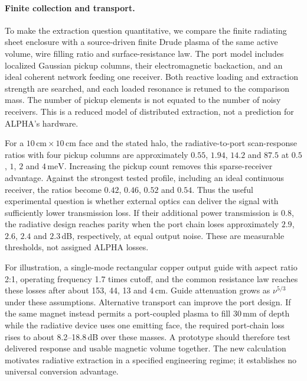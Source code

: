 \paragraph{Finite collection and transport.}
To make the extraction question quantitative, we compare the finite radiating
sheet enclosure with a source-driven finite Drude plasma of the same active
volume, wire filling ratio and surface-resistance law. The port model includes
localized Gaussian pickup columns, their electromagnetic backaction, and an
ideal coherent network feeding one receiver. Both reactive loading and
extraction strength are searched, and each loaded resonance is retuned to the
comparison mass. The number of pickup elements is not equated to the number
of noisy receivers. This is a reduced model of distributed extraction, not a
prediction for ALPHA's hardware.

For a $10\,\mathrm{cm}\times10\,\mathrm{cm}$ face and the stated halo,
the radiative-to-port scan-response ratios with four pickup columns are
approximately $0.55$, $1.94$, $14.2$ and $87.5$ at $0.5$, $1$, $2$ and
$4\,\mathrm{meV}$. Increasing the pickup count removes this sparse-receiver
advantage. Against the strongest tested profile, including an ideal continuous
receiver, the ratios become $0.42$, $0.46$, $0.52$ and $0.54$.
Thus the useful experimental question is whether external optics can deliver
the signal with sufficiently lower transmission loss. If their additional
power transmission is 0.8, the radiative design reaches parity when the port
chain loses approximately $2.9$, $2.6$, $2.4$ and $2.3$\,dB, respectively,
at equal output noise. These are measurable thresholds, not assigned ALPHA
losses.

For illustration, a single-mode rectangular copper output guide with aspect
ratio 2:1, operating frequency 1.7 times cutoff, and the common resistance law
reaches these losses after about 153, 44, 13 and 4\,cm. Guide attenuation grows
as $\nu^{5/3}$ under these assumptions. Alternative transport can improve the
port design. If the same magnet instead permits a port-coupled plasma to fill
30\,mm of depth while the radiative device uses one emitting face, the required
port-chain loss rises to about 8.2--18.8\,dB over these masses. A prototype
should therefore test delivered response and usable magnetic volume together.
The new calculation motivates radiative extraction in a specified engineering
regime; it establishes no universal conversion advantage.
